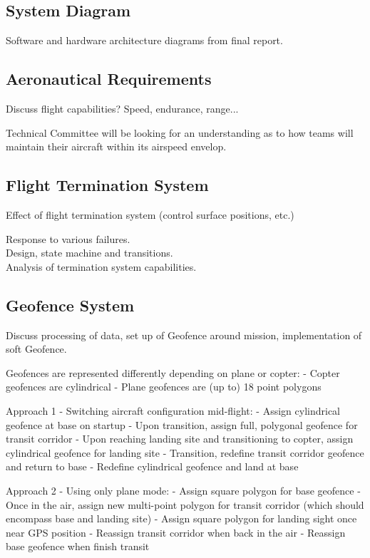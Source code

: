 \subsection{System Diagram}
Software and hardware architecture diagrams from final report.

\subsection{Aeronautical Requirements}
Discuss flight capabilities? Speed, endurance, range...

Technical Committee will be looking for an understanding as to how teams will maintain their aircraft within its airspeed envelop.

\subsection{Flight Termination System}
Effect of flight termination system (control surface positions, etc.)

Response to various failures.\\

Design, state machine and transitions.\\

Analysis of termination system capabilities.

\subsection{Geofence System}
Discuss processing of data, set up of Geofence around mission, implementation of soft Geofence.

Geofences are represented differently depending on plane or copter:
- Copter geofences are cylindrical
- Plane geofences are (up to) 18 point polygons

Approach 1 - Switching aircraft configuration mid-flight:
- Assign cylindrical geofence at base on startup
- Upon transition, assign full, polygonal geofence for transit corridor
- Upon reaching landing site and transitioning to copter, assign cylindrical geofence for landing site
- Transition, redefine transit corridor geofence and return to base
- Redefine cylindrical geofence and land at base

Approach 2 - Using only plane mode:
- Assign square polygon for base geofence
- Once in the air, assign new multi-point polygon for transit corridor (which should encompass base and landing site)
- Assign square polygon for landing sight once near GPS position
- Reassign transit corridor when back in the air
- Reassign base geofence when finish transit

